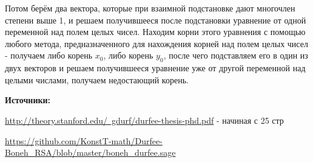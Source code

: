 \documentclass[12pt,a4paper]{scrartcl}
\begin{document}
Потом берём два вектора, которые при взаимной подстановке дают многочлен степени выше 1, и решаем получившееся после подстановки уравнение от одной переменной над полем целых чисел. Находим корни этого уравнения с помощью любого метода, предназначенного для нахождения корней над полем целых чисел - получаем либо корень $x_0$, либо корень $y_0$, после чего подставляем его в один из двух векторов и решаем получившееся уравнение уже от другой переменной над целыми числами, получаем недостающий корень.

\textbf{Источники:}

\href{http://theory.stanford.edu/~gdurf/durfee-thesis-phd.pdf}{http://theory.stanford.edu/~gdurf/durfee-thesis-phd.pdf} - начиная с 25 стр

\href{https://github.com/KonstT-math/Durfee-Boneh_RSA/blob/master/boneh_durfee.sage}{https://github.com/KonstT-math/Durfee-Boneh\_RSA/blob/master/boneh\_durfee.sage}
	
\end{document}

